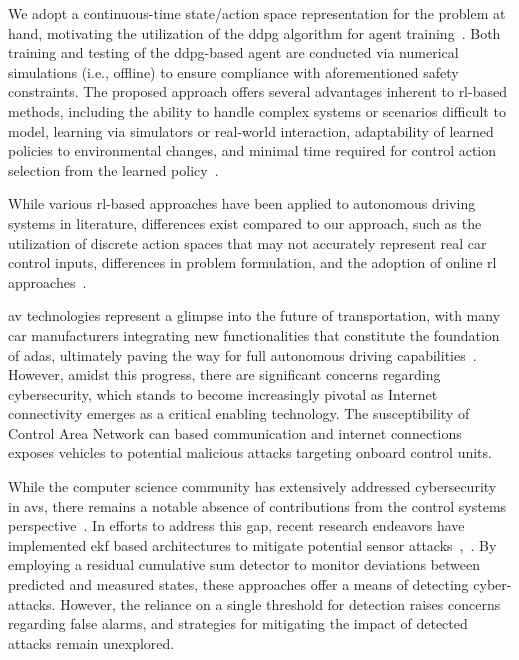 We adopt a continuous-time state/action space representation for the problem at hand, motivating the utilization of the \gls{ddpg} algorithm for agent training~\cite{lillicrap2015continuous}. Both training and testing of the \gls{ddpg}-based agent are conducted via numerical simulations (i.e., offline) to ensure compliance with aforementioned safety constraints. The proposed approach offers several advantages inherent to \gls{rl}-based methods, including the ability to handle complex systems or scenarios difficult to model, learning via simulators or real-world interaction, adaptability of learned policies to environmental changes, and minimal time required for control action selection from the learned policy~\cite{sutton2018reinforcement,bertsekas2021multiagent}.

While various \gls{rl}-based approaches have been applied to autonomous driving systems in literature, differences exist compared to our approach, such as the utilization of discrete action spaces that may not accurately represent real car control inputs, differences in problem formulation, and the adoption of online \gls{rl} approaches~\cite{everett2021collision,arvind2019autonomous}.



\gls{av} technologies represent a glimpse into the future of transportation, with many car manufacturers integrating new functionalities that constitute the foundation of \gls{adas}, ultimately paving the way for full autonomous driving capabilities~\cite{AD_mcKinsey}. However, amidst this progress, there are significant concerns regarding cybersecurity, which stands to become increasingly pivotal as Internet connectivity emerges as a critical enabling technology. The susceptibility of Control Area Network \gls{can} based communication and internet connections exposes vehicles to potential malicious attacks targeting onboard control units.

While the computer science community has extensively addressed cybersecurity in \glspl{av}, there remains a notable absence of contributions from the control systems perspective~\cite{cybersecurity_1}. In efforts to address this gap, recent research endeavors have implemented \gls{ekf} based architectures to mitigate potential sensor attacks~\cite{ekf_1_attack},~\cite{quinonez2020savior}. By employing a residual cumulative sum detector to monitor deviations between predicted and measured states, these approaches offer a means of detecting cyber-attacks. However, the reliance on a single threshold for detection raises concerns regarding false alarms, and strategies for mitigating the impact of detected attacks remain unexplored.

